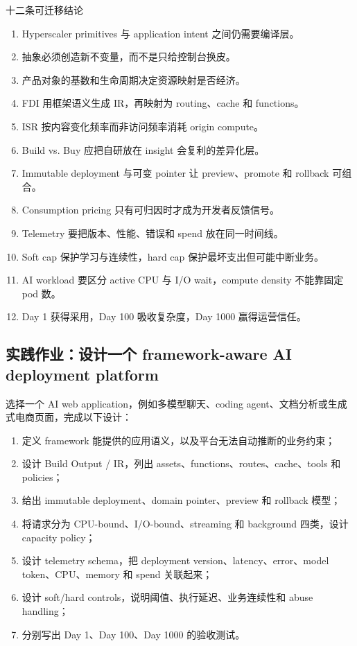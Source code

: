 \documentclass[a4paper]{article}
\begin{document}
\begin{importantbox}{十二条可迁移结论}
\begin{enumerate}
  \item Hyperscaler primitives 与 application intent 之间仍需要编译层。
  \item 抽象必须创造新不变量，而不是只给控制台换皮。
  \item 产品对象的基数和生命周期决定资源映射是否经济。
  \item FDI 用框架语义生成 IR，再映射为 routing、cache 和 functions。
  \item ISR 按内容变化频率而非访问频率消耗 origin compute。
  \item Build vs. Buy 应把自研放在 insight 会复利的差异化层。
  \item Immutable deployment 与可变 pointer 让 preview、promote 和 rollback 可组合。
  \item Consumption pricing 只有可归因时才成为开发者反馈信号。
  \item Telemetry 要把版本、性能、错误和 spend 放在同一时间线。
  \item Soft cap 保护学习与连续性，hard cap 保护最坏支出但可能中断业务。
  \item AI workload 要区分 active CPU 与 I/O wait，compute density 不能靠固定 pod 数。
  \item Day 1 获得采用，Day 100 吸收复杂度，Day 1000 赢得运营信任。
\end{enumerate}
\end{importantbox}

\subsection{实践作业：设计一个 framework-aware AI deployment platform}

选择一个 AI web application，例如多模型聊天、coding agent、文档分析或生成式电商页面，完成以下设计：

\begin{enumerate}
  \item 定义 framework 能提供的应用语义，以及平台无法自动推断的业务约束；
  \item 设计 Build Output / IR，列出 assets、functions、routes、cache、tools 和 policies；
  \item 给出 immutable deployment、domain pointer、preview 和 rollback 模型；
  \item 将请求分为 CPU-bound、I/O-bound、streaming 和 background 四类，设计 capacity policy；
  \item 设计 telemetry schema，把 deployment version、latency、error、model token、CPU、memory 和 spend 关联起来；
  \item 设计 soft/hard controls，说明阈值、执行延迟、业务连续性和 abuse handling；
  \item 分别写出 Day 1、Day 100、Day 1000 的验收测试。
\end{enumerate}
\end{document}
